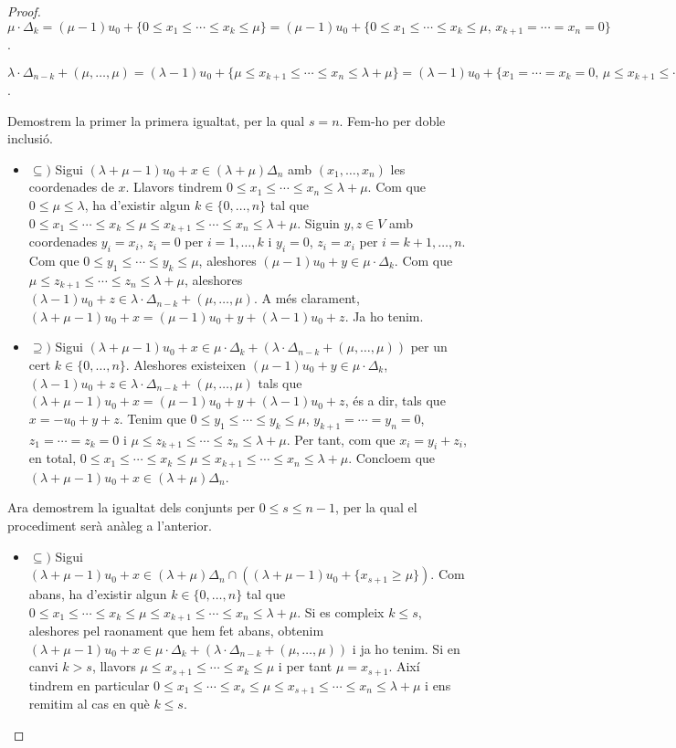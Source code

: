 \documentclass{article}
\theoremstyle{definition}
\begin{document}
\begin{proof}
$\mu\cdot\Delta_k=(\mu-1)u_0+\{0\leq x_1\leq\cdots\leq x_k\leq\mu\}=(\mu-1)u_0+\{0\leq x_1\leq\cdots\leq x_k\leq\mu,\,x_{k+1}=\cdots=x_n=0\}$.

$\lambda\cdot\Delta_{n-k}+(\mu,\ldots,\mu)=(\lambda-1)u_0+\{\mu\leq x_{k+1}\leq\cdots\leq x_n\leq\lambda+\mu\}=(\lambda-1)u_0+\{x_1=\cdots=x_k=0,\,\mu\leq x_{k+1}\leq\cdots\leq x_n\leq\lambda+\mu\}$.

Demostrem la primer la primera igualtat, per la qual $s=n$. Fem-ho per doble inclusi\'{o}.
\begin{itemize}
    \item $\subseteq)$ Sigui $(\lambda+\mu-1)u_0+x\in(\lambda+\mu)\Delta_n$ amb $(x_1,\ldots,x_n)$ les coordenades de $x$. Llavors tindrem $0\leq x_1\leq\cdots\leq x_n\leq\lambda+\mu$. Com que $0\leq\mu\leq\lambda$, ha d'existir algun $k\in\{0,\ldots,n\}$ tal que $0\leq x_1\leq\cdots\leq x_k\leq\mu\leq x_{k+1}\leq\cdots\leq x_n\leq\lambda+\mu$. Siguin $y,z\in V$ amb coordenades $y_i=x_i$, $z_i=0$ per $i=1,\ldots,k$ i $y_i=0$, $z_i=x_i$ per $i=k+1,\ldots,n$. Com que $0\leq y_1\leq\cdots\leq y_k\leq\mu$, aleshores $(\mu-1)u_0+y\in\mu\cdot\Delta_k$. Com que $\mu\leq z_{k+1}\leq\cdots\leq z_n\leq\lambda+\mu$, aleshores $(\lambda-1)u_0+z\in \lambda\cdot\Delta_{n-k}+(\mu,\ldots,\mu)$. A m\'{e}s clarament, $(\lambda+\mu-1)u_0+x=(\mu-1)u_0+y+(\lambda-1)u_0+z$. Ja ho tenim.
    \item $\supseteq)$ Sigui $(\lambda+\mu-1)u_0+x\in\mu\cdot\Delta_k+(\lambda\cdot\Delta_{n-k}+(\mu,\ldots,\mu))$ per un cert $k\in\{0,\ldots,n\}$. Aleshores existeixen $(\mu-1)u_0+y\in\mu\cdot\Delta_k$, $(\lambda-1)u_0+z\in\lambda\cdot\Delta_{n-k}+(\mu,\ldots,\mu)$ tals que $(\lambda+\mu-1)u_0+x=(\mu-1)u_0+y+(\lambda-1)u_0+z$, \'{e}s a dir, tals que $x=-u_0+y+z$. Tenim que $0\leq y_1\leq\cdots\leq y_k\leq\mu$, $y_{k+1}=\cdots=y_n=0$, $z_1=\cdots=z_k=0$ i $\mu\leq z_{k+1}\leq\cdots\leq z_n\leq\lambda+\mu$. Per tant, com que $x_i=y_i+z_i$, en total, $0\leq x_1\leq\cdots\leq x_k\leq\mu\leq x_{k+1}\leq\cdots\leq x_n\leq\lambda+\mu$. Concloem que $(\lambda+\mu-1)u_0+x\in(\lambda+\mu)\Delta_n$.
\end{itemize}
Ara demostrem la igualtat dels conjunts per $0\leq s\leq n-1$, per la qual el procediment ser\`{a} an\`{a}leg a l'anterior.
\begin{itemize}
    \item $\subseteq)$ Sigui $(\lambda+\mu-1)u_0+x\in(\lambda+\mu)\Delta_n\cap((\lambda+\mu-1)u_0+\{x_{s+1}\geq\mu\})$. Com abans, ha d'existir algun $k\in\{0,\ldots,n\}$ tal que $0\leq x_1\leq\cdots\leq x_k\leq\mu\leq x_{k+1}\leq\cdots\leq x_n\leq\lambda+\mu$. Si es compleix $k\leq s$, aleshores pel raonament que hem fet abans, obtenim $(\lambda+\mu-1)u_0+x\in\mu\cdot\Delta_k+(\lambda\cdot\Delta_{n-k}+(\mu,\ldots,\mu))$ i ja ho tenim. Si en canvi $k>s$, llavors $\mu\leq x_{s+1}\leq\cdots\leq x_k\leq\mu$ i per tant $\mu=x_{s+1}$. Aix\'{i} tindrem en particular $0\leq x_1\leq\cdots\leq x_s\leq\mu\leq x_{s+1}\leq\cdots\leq x_n\leq\lambda+\mu$ i ens remitim al cas en qu\`{e} $k\leq s$.

\end{itemize}
\end{proof}
\end{document}
